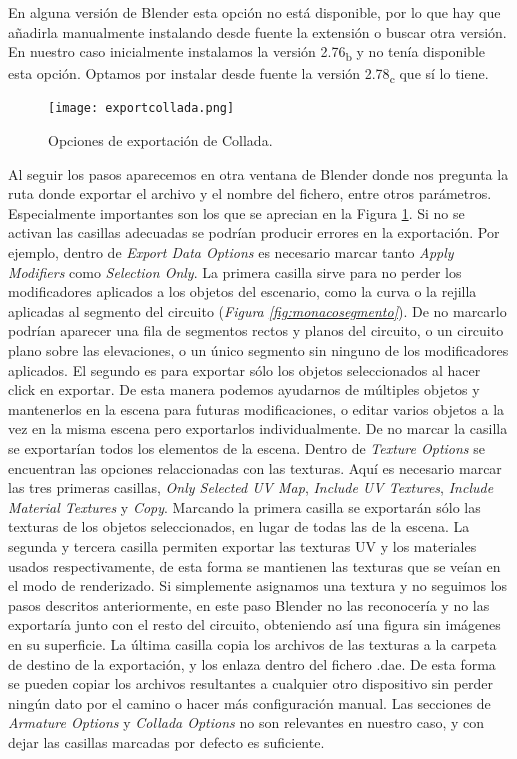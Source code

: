 En alguna versión de Blender esta opción no está disponible, por lo que hay que añadirla manualmente instalando desde fuente la extensión o buscar otra versión. En nuestro caso inicialmente instalamos la versión 2.76\textsubscript{b} y no tenía disponible esta opción. Optamos por instalar desde fuente la versión 2.78\textsubscript{c} que sí lo tiene. 

\begin{figure}[t]
	\centering
	\texttt{[image: exportcollada.png]}
	\caption{Opciones de exportación de Collada.} \label{fig:exportcollada}
\end{figure}

Al seguir los pasos aparecemos en otra ventana de Blender donde nos pregunta la ruta donde exportar el archivo y el nombre del fichero, entre otros parámetros. Especialmente importantes son los que se aprecian en la Figura \ref{fig:exportcollada}. Si no se activan las casillas adecuadas se podrían producir errores en la exportación. Por ejemplo, dentro de \textit{Export Data Options} es necesario marcar tanto \textit{Apply Modifiers} como \textit{Selection Only}. La primera casilla sirve para no perder los modificadores aplicados a los objetos del escenario, como la curva o la rejilla aplicadas al segmento del circuito (\textit{Figura \ref{fig:monacosegmento}}). De no marcarlo podrían aparecer una fila de segmentos rectos y planos del circuito, o un circuito plano sobre las elevaciones, o un único segmento sin ninguno de los modificadores aplicados. El segundo es para exportar sólo los objetos seleccionados al hacer click en exportar. De esta manera podemos ayudarnos de múltiples objetos y mantenerlos en la escena para futuras modificaciones, o editar varios objetos a la vez en la misma escena pero exportarlos individualmente. De no marcar la casilla se exportarían todos los elementos de la escena. Dentro de \textit{Texture Options} se encuentran las opciones relaccionadas con las texturas. Aquí es necesario marcar las tres primeras casillas, \textit{Only Selected UV Map}, \textit{Include UV Textures}, \textit{Include Material Textures} y \textit{Copy}. Marcando la primera casilla se exportarán sólo las texturas de los objetos seleccionados, en lugar de todas las de la escena. La segunda y tercera casilla permiten exportar las texturas UV y los materiales usados respectivamente, de esta forma se mantienen las texturas que se veían en el modo de renderizado. Si simplemente asignamos una textura y no seguimos los pasos descritos anteriormente, en este paso Blender no las reconocería y no las exportaría junto con el resto del circuito, obteniendo así una figura sin imágenes en su superficie. La última casilla copia los archivos de las texturas a la carpeta de destino de la exportación, y los enlaza dentro del fichero .dae. De esta forma se pueden copiar los archivos resultantes a cualquier otro dispositivo sin perder ningún dato por el camino o hacer más configuración manual. Las secciones de \textit{Armature Options} y \textit{Collada Options} no son relevantes en nuestro caso, y con dejar las casillas marcadas por defecto es suficiente.

